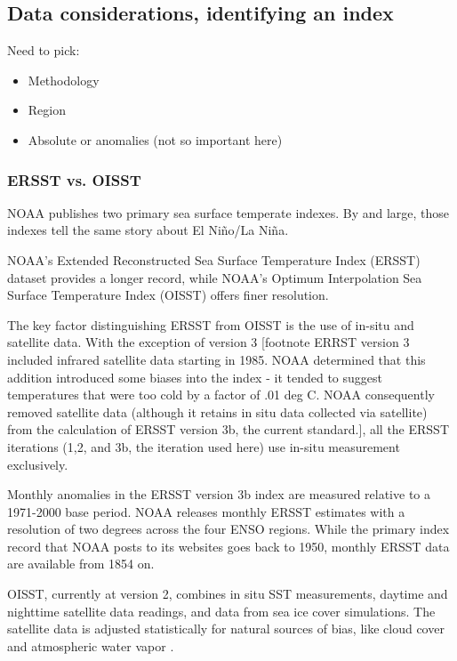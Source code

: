 \documentclass[authoryear]{article}
\begin{document}
\subsection{Data considerations, identifying an index}
Need to pick:
\begin{itemize}
\item Methodology
\item Region
\item Absolute or anomalies (not so important here)
\end{itemize}

\subsubsection{ERSST vs. OISST}

NOAA publishes two primary sea surface temperate indexes. By and large, those indexes tell the same story about El Ni\~no/La Ni\~na.

NOAA's Extended Reconstructed Sea Surface Temperature Index (ERSST) dataset provides a longer record, while NOAA's Optimum Interpolation Sea Surface Temperature Index (OISST) offers finer resolution. 

The key factor distinguishing ERSST from OISST is the use of in-situ and satellite data. With the exception of version 3 [footnote ERRST version 3 included infrared satellite data starting in 1985. NOAA determined that this addition introduced some biases into the index - it tended to suggest temperatures that were too cold by a factor of .01 deg C. NOAA consequently removed satellite data (although it retains in situ data collected via satellite) from the calculation of ERSST version 3b, the current standard.], all the ERSST iterations (1,2, and 3b, the iteration used here) use in-situ measurement exclusively\cite{smith2004improved}\cite{smith2003extended}\cite{smith2008improvements}.

Monthly anomalies in the ERSST version 3b index are measured relative to a 1971-2000 base period\cite{xue2003interdecadal}. NOAA releases monthly ERSST estimates with a resolution of two degrees across the four ENSO regions. While the primary index record that NOAA posts to its websites goes back to 1950, monthly ERSST data are available from 1854 on.

OISST, currently at version 2, combines in situ SST measurements, daytime and nighttime satellite data readings, and data from sea ice cover simulations. The satellite data is adjusted statistically for natural sources of bias, like cloud cover and atmospheric water vapor\cite{reynolds2002improved} \cite{reynolds1994improved} \cite{reynolds1993improved} \cite{reynolds1988real}. 
\end{document}
